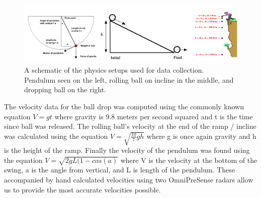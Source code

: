 \begin{figure}[t!]
\includegraphics[width=\columnwidth]{Images/phys.png}
\caption{A schematic of the physics setups used for data collection. Pendulum seen on the left, rolling ball on incline in the middle, and dropping ball on the right.}\label{fig:phys.png} 
\end{figure}

The velocity data for the ball drop was computed using the commonly known equation $V = gt$ where gravity is 9.8 meters per second squared and t is the time since ball was released. The rolling ball's velocity at the end of the ramp / incline was calculated using the equation $V =  \sqrt{ \frac{10}{7}gh}$ where g is once again gravity and h is the height of the ramp. Finally the velocity of the pendulum was found using the equation $V =  \sqrt{2gL(1-cos(a)}$ where V is the velocity at the bottom of the swing, a is the angle from vertical, and L is length of the pendulum. These accompanied by hand calculated velocities using two OmniPreSense radars allow us to provide the most accurate velocities possible.

